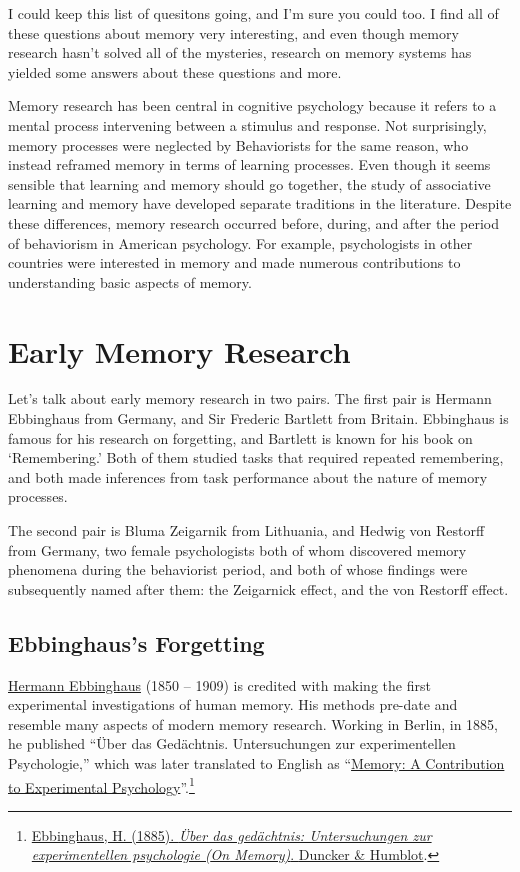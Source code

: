 \documentclass[
  oneside,
  12pt]{crumpbook}
\begin{document}
I could keep this list of quesitons going, and I'm sure you could too. I find all of these questions about memory very interesting, and even though memory research hasn't solved all of the mysteries, research on memory systems has yielded some answers about these questions and more.

Memory research has been central in cognitive psychology because it refers to a mental process intervening between a stimulus and response. Not surprisingly, memory processes were neglected by Behaviorists for the same reason, who instead reframed memory in terms of learning processes. Even though it seems sensible that learning and memory should go together, the study of associative learning and memory have developed separate traditions in the literature. Despite these differences, memory research occurred before, during, and after the period of behaviorism in American psychology. For example, psychologists in other countries were interested in memory and made numerous contributions to understanding basic aspects of memory.

\hypertarget{early-memory-research}{%
\section{Early Memory Research}\label{early-memory-research}}

Let's talk about early memory research in two pairs. The first pair is Hermann Ebbinghaus from Germany, and Sir Frederic Bartlett from Britain. Ebbinghaus is famous for his research on forgetting, and Bartlett is known for his book on `Remembering.' Both of them studied tasks that required repeated remembering, and both made inferences from task performance about the nature of memory processes.

The second pair is Bluma Zeigarnik from Lithuania, and Hedwig von Restorff from Germany, two female psychologists both of whom discovered memory phenomena during the behaviorist period, and both of whose findings were subsequently named after them: the Zeigarnick effect, and the von Restorff effect.

\hypertarget{ebbinghauss-forgetting}{%
\subsection{Ebbinghaus's Forgetting}\label{ebbinghauss-forgetting}}

\href{https://en.wikipedia.org/wiki/Hermann_Ebbinghaus}{Hermann Ebbinghaus} (1850 -- 1909) is credited with making the first experimental investigations of human memory. His methods pre-date and resemble many aspects of modern memory research. Working in Berlin, in 1885, he published ``Über das Gedächtnis. Untersuchungen zur experimentellen Psychologie,'' which was later translated to English as ``\href{https://archive.org/details/memorycontributi00ebbiuoft}{Memory: A Contribution to Experimental Psychology}''.\footnote{\protect\hyperlink{ref-ebbinghausUberGedachtnisUntersuchungen1885}{Ebbinghaus, H. (1885). \emph{Über das gedächtnis: Untersuchungen zur experimentellen psychologie ({On Memory})}. {Duncker \& Humblot}}.}
\end{document}

